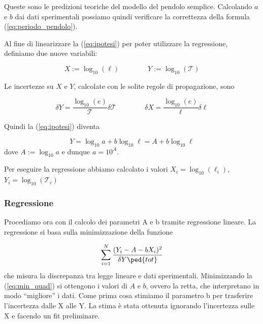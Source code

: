 Queste sono le predizioni teoriche del modello del pendolo semplice. Calcolando $a$ e $b$ dai dati sperimentali
possiamo quindi verificare la correttezza della formula (\ref{eq:periodo_pendolo}).

Al fine di linearizzare la (\ref{eq:ipotesi}) per poter utilizzare la regressione, definiamo due nuove variabili:

\begin{equation}
    X := \log_{10}{(\ell)} \qquad \qquad Y := \log_{10}{(\mathcal{T})}
\end{equation}

Le incertezze su $X$ e $Y$, calcolate con le solite regole di propagazione, sono

\begin{equation}
    \delta Y = \frac{\log_{10}(e)}{\mathcal{T}}\delta\mathcal{T}
    \qquad \qquad
    \delta X = \frac{\log_{10}(e)}{\ell}\delta \ell
\end{equation}

Quindi la (\ref{eq:ipotesi}) diventa

\begin{equation}
    Y = \log_{10} a + b \log_{10} \ell = A + b \log_{10} \ell
\end{equation}
%
dove $A := \log_{10} a$ e dunque $a = 10^A$.

Per eseguire la regressione abbiamo calcolato i valori $X_i = \log_{10}(\ell_i)$,
$Y_i = \log_{10}(\mathcal{T}_i)$


\subsubsection{Regressione}

Procediamo ora con il calcolo dei parametri A e b tramite regressione lineare. 
La regressione si basa sulla minimizzazione della funzione

\begin{equation}
    \sum_{i=1}^N \frac{(Y_i - A - bX_i)^2}{\delta Y\ped{tot}}
    \label{eq:min_quad}
\end{equation}
%
che misura la discrepanza tra legge lineare e dati sperimentali. Minimizzando la (\ref{eq:min_quad}) si ottengono
i valori di $A$ e $b$, ovvero la retta, che interpretano in modo ``migliore'' i dati.
Come prima cosa stimiamo il parametro b
per trasferire l'incertezza dalle X alle Y. La stima è stata ottenuta ignorando l'incertezza sulle X e facendo un fit preliminare.



